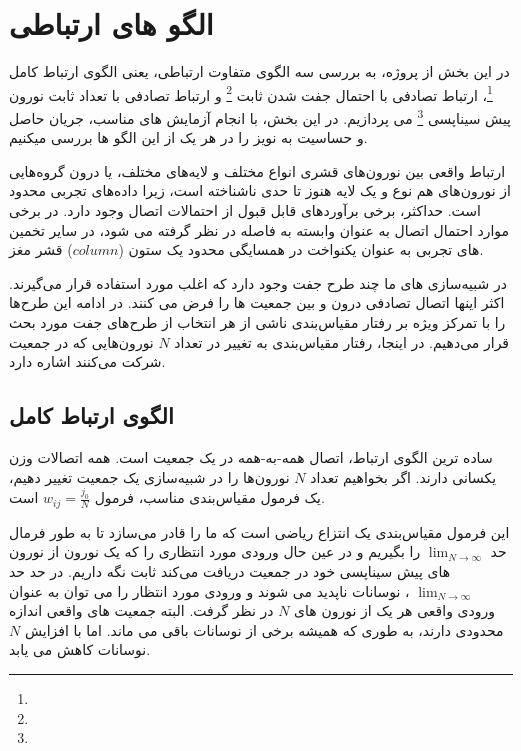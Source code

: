 
\section{الگو های ارتباطی}
    در این بخش از پروژه، به بررسی سه الگوی متفاوت ارتباطی، یعنی الگوی ارتباط کامل
    \footnote{}، 
    ارتباط تصادفی با احتمال جفت شدن ثابت
    \footnote{}
    و ارتباط تصادفی با تعداد ثابت نورون پیش سیناپسی
    \footnote{}
    می پردازیم. در این بخش، با انجام آزمایش های مناسب، جریان حاصل و حساسیت به نویز را در هر یک از این الگو ها بررسی میکنیم.

    ارتباط واقعی بین نورون‌های قشری انواع مختلف و لایه‌های مختلف، یا درون گروه‌هایی از نورون‌های هم نوع و یک لایه هنوز تا حدی ناشناخته است، زیرا داده‌های تجربی محدود است. حداکثر، برخی برآوردهای قابل قبول از احتمالات اتصال وجود دارد. در برخی موارد احتمال اتصال به عنوان وابسته به فاصله در نظر گرفته می شود، در سایر تخمین های تجربی به عنوان یکنواخت در همسایگی محدود یک ستون
    ($column$)
    قشر مغز.
    \cite{Neuronal-Dynamics}

    در شبیه‌سازی های ما چند طرح جفت وجود دارد که اغلب مورد استفاده قرار می‌گیرند. اکثر اینها اتصال تصادفی درون و بین جمعیت ها را فرض می کنند. در ادامه این طرح‌ها را با تمرکز ویژه بر رفتار مقیاس‌بندی ناشی از هر انتخاب از طرح‌های جفت مورد بحث قرار می‌دهیم. در اینجا، رفتار مقیاس‌بندی به تغییر در تعداد 
    $N$
    نورون‌هایی که در جمعیت شرکت می‌کنند اشاره دارد.
    \cite{Neuronal-Dynamics}
    \subsection{الگوی ارتباط کامل}
        ساده ترین الگوی ارتباط، اتصال همه-به-همه در یک جمعیت است. همه اتصالات وزن یکسانی دارند. اگر بخواهیم تعداد 
        $N$
        نورون‌ها را در شبیه‌سازی یک جمعیت تغییر دهیم، یک فرمول مقیاس‌بندی مناسب، فرمول 
        $w_{ij} = \frac{j_0}{N}$
        است.

        این فرمول مقیاس‌بندی یک انتزاع ریاضی است که ما را قادر می‌سازد تا به طور فرمال حد 
        $\lim_{N\rightarrow \infty}$
        را بگیریم و در عین حال ورودی مورد انتظاری را که یک نورون از نورون های پیش سیناپسی خود در جمعیت دریافت می‌کند ثابت نگه داریم. در حد حد 
        $\lim_{N\rightarrow \infty}$
        ، نوسانات ناپدید می شوند و ورودی مورد انتظار را می توان به عنوان ورودی واقعی هر یک از نورون های 
        $N$ 
        در نظر گرفت. البته جمعیت های واقعی اندازه محدودی دارند، به طوری که همیشه برخی از نوسانات باقی می ماند. اما با افزایش 
        $N$
        نوسانات کاهش می یابد. \cite{Neuronal-Dynamics}
        
